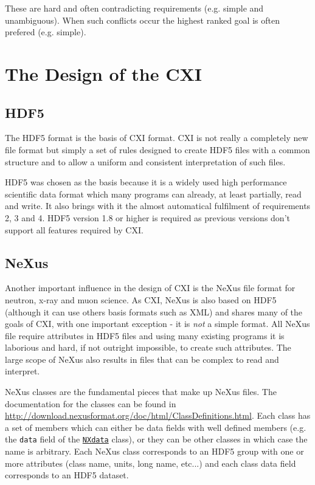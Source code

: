 \documentclass[usletter,11pt]{article}
\begin{document}
These are hard and often contradicting requirements (e.g. simple and unambiguous). When such conflicts occur the highest ranked goal is often prefered (e.g. simple). 

\section{The Design of the CXI} 

\subsection{HDF5}

The HDF5 format is the basis of CXI format. CXI is not really a completely new file format but simply a set of rules designed to create HDF5 files with a common structure and to allow a uniform and consistent interpretation of such files.

HDF5 was chosen as the basis because it is a widely used high
performance scientific data format which many programs can already, at
least partially,  read and write. It also brings with it the almost
automatical fulfilment of requirements 2, 3 and 4. HDF5 version 1.8 or
higher is required as previous versions don't support all features
required by CXI.

\subsection{NeXus}
Another important influence in the design of CXI is the NeXus file format for neutron, x-ray and muon science.
As CXI, NeXus is also based on HDF5 (although it can use others basis formats such as XML) and shares many of the goals of CXI, with one important exception - it is {\em not} a simple format. All NeXus file require attributes in HDF5 files and using many existing programs it is laborious and hard, if not outright impossible, to create such attributes. The large scope of NeXus also results in files that can be complex to read and interpret.

NeXus classes are the fundamental pieces that make up NeXus files. The documentation for the classes can be found in \url{http://download.nexusformat.org/doc/html/ClassDefinitions.html}. Each class has a set of members which can either be data fields with well defined members (e.g. the {\tt data} field of the \hyperref[table:data]{\tt NXdata} class), or they can be other classes in which case the name is arbitrary. Each NeXus class corresponds to an HDF5 group with one or more attributes (class name, units, long name, etc...) and each class data field corresponds to an HDF5 dataset. 
\end{document}
